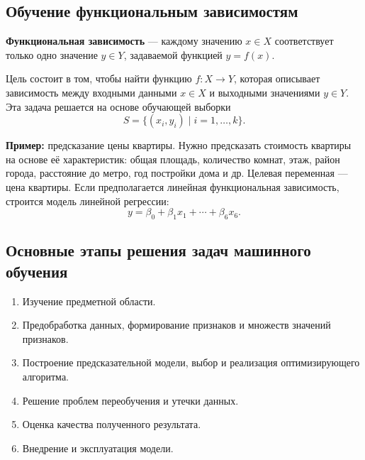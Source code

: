 \subsection*{Обучение функциональным зависимостям}

\textbf{Функциональная зависимость} — каждому значению $x \in X$ соответствует только одно значение $y \in Y$, задаваемой функцией $y=f(x)$.

Цель состоит в том, чтобы найти функцию $f\colon X\to Y$, которая описывает зависимость между входными данными $x \in X$ и выходными значениями $y \in Y$. Эта задача решается на основе обучающей выборки
\[
  S=\{(x_i,y_i)\mid i=1,\ldots,k\}.
\]

\textbf{Пример:} предсказание цены квартиры. Нужно предсказать стоимость квартиры на основе её характеристик: общая площадь, количество комнат, этаж, район города, расстояние до метро, год постройки дома и др. Целевая переменная — цена квартиры. Если предполагается линейная функциональная зависимость, строится модель линейной регрессии:
\[
  y = \beta_0 + \beta_1 x_1 + \cdots + \beta_6 x_6.
\]

\subsection*{Основные этапы решения задач машинного обучения}

\begin{enumerate}
  \item Изучение предметной области.
  \item Предобработка данных, формирование признаков и множеств значений признаков.
  \item Построение предсказательной модели, выбор и реализация оптимизирующего алгоритма.
  \item Решение проблем переобучения и утечки данных.
  \item Оценка качества полученного результата.
  \item Внедрение и эксплуатация модели.
\end{enumerate}

\clearpage
